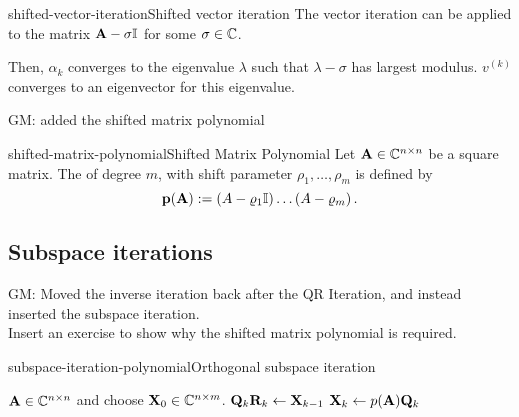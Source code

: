 \begin{Algorithm*}{shifted-vector-iteration}{Shifted vector iteration}
  The vector iteration can be applied to the matrix $\mathbf A-\sigma\mathbb I$
  for some $\sigma\in\mathbb C$.

  Then, $\alpha_k$ converges to the eigenvalue $\lambda$ such that
  $\lambda-\sigma$ has largest modulus. $v^{(k)}$ converges to an
  eigenvector for this eigenvalue.
\end{Algorithm*}

\begin{todo}
  GM: added the shifted matrix polynomial
\end{todo}
\begin{Definition}{shifted-matrix-polynomial}{Shifted Matrix Polynomial}
  Let \(\mathbf A \in \mathbb C^{n \times n}\) be a square matrix.
  The  of degree \(m\), with shift parameter \(\rho_1, \ldots, \rho_m\) is defined by
  \[ \mathbf{p(A)} := \left( A - \varrho_1 \mathbb I \right) \dots \left( A - \varrho_m\right).\]
\end{Definition}

\subsection{Subspace iterations}

\begin{intro}
  
\end{intro}

\begin{todo}
  GM:
  Moved the inverse iteration back after the QR Iteration, and instead inserted the subspace iteration.\\
  Insert an exercise to show why the shifted matrix polynomial is required.
\end{todo}

\begin{Algorithm*}{subspace-iteration-polynomial}{Orthogonal subspace iteration}
  \begin{algorithmic}[1]
    \Require $\mathbf A\in\mathbb C^{n\times n}$ and choose $\mathbf X_0 \in \mathbb C^{n\times m}$.
    \State $\mathbf Q_k\mathbf R_k \gets \mathbf X_{k-1}$ 
    \State $\mathbf X_{k} \gets p(\mathbf A) \mathbf Q_{k}$
    \EndFor
    \
  \end{algorithmic}
\end{Algorithm*}



